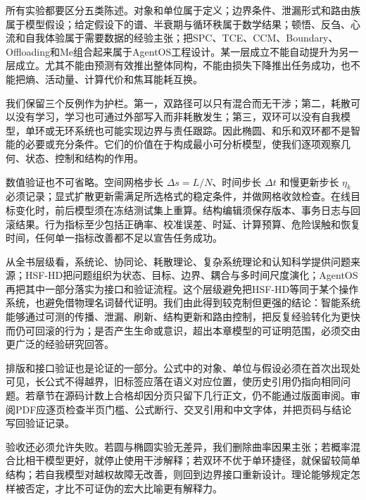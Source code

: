 所有实验都要区分五类陈述。对象和单位属于定义；边界条件、泄漏形式和路由族属于模型假设；给定假设下的谱、半衰期与循环秩属于数学结果；顿悟、反刍、心流和自我体验属于需要数据的经验主张；把SPC、TCE、CCM、Boundary、Offloading和Me组合起来属于AgentOS工程设计。某一层成立不能自动提升为另一层成立。尤其不能由预测有效推出整体同构，不能由损失下降推出任务成功，也不能把熵、活动量、计算代价和焦耳能耗互换。

我们保留三个反例作为护栏。第一，双路径可以只有混合而无干涉；第二，耗散可以没有学习，学习也可通过外部写入而非耗散发生；第三，双环可以没有自我模型，单环或无环系统也可能实现边界与责任跟踪。因此椭圆、和乐和双环都不是智能的必要或充分条件。它们的价值在于构成最小可分析模型，使我们逐项观察几何、状态、控制和结构的作用。

数值验证也不可省略。空间网格步长 $\Delta s=L/N$、时间步长 $\Delta t$ 和慢更新步长 $\eta_k$ 必须记录；显式扩散更新需满足所选格式的稳定条件，并做网格收敛检查。在线目标变化时，前后模型须在冻结测试集上重算。结构编辑须保存版本、事务日志与回滚结果。行为指标至少包括正确率、校准误差、时延、计算预算、危险误触和恢复时间，任何单一指标改善都不足以宣告任务成功。

从全书层级看，系统论、协同论、耗散理论、复杂系统理论和认知科学提供问题来源；HSF-HD把问题组织为状态、目标、边界、耦合与多时间尺度演化；AgentOS再把其中一部分落实为接口和验证流程。这个层级避免把HSF-HD等同于某个操作系统，也避免借物理名词替代证明。我们由此得到较克制但更强的结论：智能系统能够通过可测的传播、泄漏、刷新、结构更新和路由控制，把反复经验转化为更快而仍可回滚的行为；是否产生生命或意识，超出本章模型的可证明范围，必须交由更广泛的经验研究回答。

排版和接口验证也是论证的一部分。公式中的对象、单位与假设必须在首次出现处可见，长公式不得越界，旧标签应落在语义对应位置，使历史引用仍指向相同问题。若章节在源码计数上合格却因分页只留下几行正文，仍不能通过版面审阅。审阅PDF应逐页检查半页门槛、公式断行、交叉引用和中文字体，并把页码与结论写回验证记录。

验收还必须允许失败。若圆与椭圆实验无差异，我们删除曲率因果主张；若概率混合比相干模型更好，就停止使用干涉解释；若双环不优于单环捷径，就保留较简单结构；若自我模型对越权故障无改善，则回到边界接口重新设计。理论能够规定怎样被否定，才比不可证伪的宏大比喻更有解释力。

